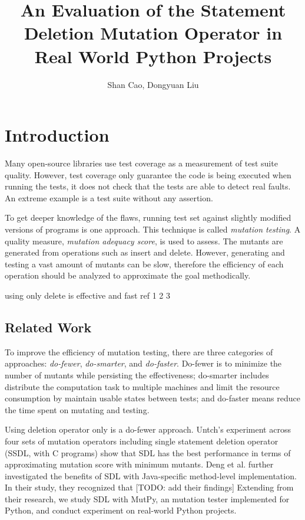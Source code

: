 \documentclass[12pt]{article}
\title{\textbf{An Evaluation of the Statement Deletion Mutation Operator in Real World Python Projects}}
\author{Shan Cao, Dongyuan Liu}
\begin{document}
\maketitle
\tableofcontents

\section{Introduction}

Many open-source libraries use test coverage as a measurement of test suite quality. However, test coverage only guarantee the code is being executed when running the tests, it does not check that the tests are able to detect real faults. An extreme example is a test suite without any assertion.

To get deeper knowledge of the flaws, running test set against slightly modified versions of programs is one approach\cite{}. This technique is called \emph{mutation testing}. A quality measure, \emph{mutation adequacy score}, is used to assess. The mutants are generated from operations such as insert and delete. However, generating and testing a vast amount of mutants can be slow, therefore the efficiency of each operation should be analyzed to approximate the goal methodically.

using only delete is effective and fast ref 1 2 3

\subsection{Related Work}

To improve the efficiency of mutation testing, there are three categories of approaches: \emph{do-fewer}, \emph{do-smarter}, and \emph{do-faster}\cite{}. Do-fewer is to minimize the number of mutants while persisting the effectiveness; do-smarter includes distribute the computation task to multiple machines and limit the resource consumption by maintain usable states between tests; and do-faster means reduce the time spent on mutating and testing.

Using deletion operator only is a do-fewer approach. Untch's experiment across four sets of mutation operators including single statement deletion operator (SSDL, with C programs) show that SDL has the best performance in terms of approximating mutation score with minimum mutants\cite{}. Deng et al. further investigated the benefits of SDL with Java-specific method-level implementation\cite{}. In their study, they recognized that [TODO: add their findings] Extending from their research, we study SDL with MutPy, an mutation tester implemented for Python, and conduct experiment on real-world Python projects.
\end{document}
